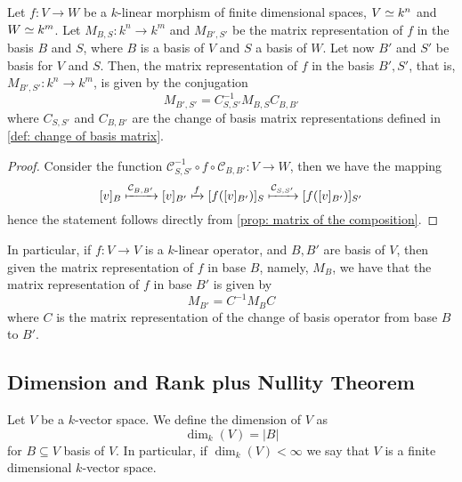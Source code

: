\begin{proposition}
  \label{prop: change of basis, linear morphism}
  Let \(f : V \to W\) be a \(k\)-linear morphism of finite dimensional spaces,
  \(V \simeq k^n\) and \(W \simeq k^m\). Let \(M_{B, S} : k^n \to k^m\) and \(M_{B',
  S'}\) be the matrix representation of \(f\) in the basis \(B\) and \(S\),
  where \(B\) is a basis of \(V\) and \(S\) a basis of \(W\). Let now \(B'\) and
  \(S'\) be basis for \(V\) and \(S\). Then, the matrix representation of \(f\)
  in the basis \(B', S'\), that is, \(M_{B', S'} : k^n \to k^m\), is given by
  the conjugation
  \[
    M_{B', S'} = C_{S, S'}^{-1} M_{B, S} C_{B, B'}
  \]
  where \(C_{S, S'}\) and \(C_{B, B'}\) are the change of basis matrix
  representations defined in \cref{def: change of basis matrix}.
\end{proposition}

\begin{proof}
  Consider the function \(\mathcal{C}_{S, S'}^{-1} \circ f \circ \mathcal{C}_{B,
  B'} : V \to W\), then we have the mapping
  \[
    [v]_B \xmapsto{\mathcal{C}_{B, B'}} [v]_{B'}
    \xmapsto f [f([v]_{B'})]_S
    \xmapsto{\mathcal{C}_{S, S'}} [f([v]_{B'})]_{S'}
  \]
  hence the statement follows directly from \cref{prop: matrix of the
  composition}.
\end{proof}

\begin{corollary}\label{cor: change of basis, linear operator}
  In particular, if \(f : V \to V\) is a \(k\)-linear operator, and \(B, B'\)
  are basis of \(V\), then given the matrix representation of \(f\) in base
  \(B\), namely, \(M_B\), we have that the matrix representation of \(f\) in
  base \(B'\) is given by
  \[
    M_{B'} = C^{-1} M_B C
  \]
  where \(C\) is the matrix representation of the change of basis operator from
  base \(B\) to \(B'\).
\end{corollary}

\subsection{Dimension and Rank plus Nullity Theorem}

\begin{definition}
  Let \(V\) be a \(k\)-vector space. We define the dimension of \(V\) as
  \[
    \dim_k(V) = |B|
  \]
  for \(B \subseteq V\) basis of \(V\). In particular, if \(\dim_k(V) < \infty\)
  we say that \(V\) is a finite dimensional \(k\)-vector space.
\end{definition}

